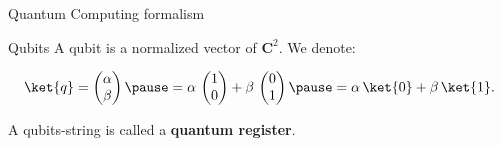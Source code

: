 \documentclass{beamer}
\begin{document}
\begin{frame}{Quantum Computing formalism}
    \begin{block}{Qubits}
        A qubit  is a normalized vector of $\mathbf{C}^2$. We denote:
        
        \[\ket{q}=\begin{pmatrix}\alpha\\\beta\end{pmatrix}\pause=\alpha\,\begin{pmatrix}1\\0\end{pmatrix} + \beta\,\begin{pmatrix}0\\1\end{pmatrix}\pause=\alpha\,\ket{0}+\beta\,\ket{1}.\]
        
        \pause A qubits-string is called a \textbf{quantum register}.
    \end{block}
\end{frame}
\end{document}
